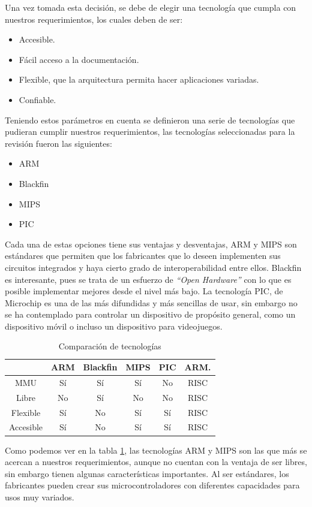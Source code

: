 Una vez tomada esta decisión, se debe de elegir una tecnología que
cumpla con nuestros requerimientos, los cuales deben de ser:
\begin{itemize}
\item Accesible.
\item Fácil acceso a la documentación.
\item Flexible, que la arquitectura permita hacer aplicaciones variadas.
\item Confiable.
\end{itemize}
Teniendo estos parámetros en cuenta se definieron una serie de tecnologías
que pudieran cumplir nuestros requerimientos, las tecnologías seleccionadas
para la revisión fueron las siguientes:
\begin{itemize}
\item \ac{ARM}
\item Blackfin
\item \ac{MIPS}
\item \ac{PIC}
\end{itemize}
Cada una de estas opciones tiene sus ventajas y desventajas, \ac{ARM}
y \ac{MIPS} son estándares que permiten que los fabricantes que lo
deseen implementen sus circuitos integrados y haya cierto grado de
interoperabilidad entre ellos. Blackfin es interesante, pues se trata
de un esfuerzo de \emph{{}``Open Hardware'' }con lo que es posible
implementar mejores desde el nivel más bajo. La tecnología \ac{PIC},
de Microchip es una de las más difundidas y más sencillas de usar,
sin embargo no se ha contemplado para controlar un dispositivo de
propósito general, como un dispositivo móvil o incluso un dispositivo
para videojuegos.%
\begin{table}
\begin{tabular}{|c|c|c|c|c|c|}
\cline{2-6} 
\multicolumn{1}{c|}{} & ARM & Blackfin & MIPS & PIC & ARM.\tabularnewline
\hline 
MMU & Sí & Sí & Sí & No & RISC\tabularnewline
\hline 
Libre & No & Sí & No & No & RISC\tabularnewline
\hline 
Flexible & Sí & No & Sí & Sí & RISC\tabularnewline
\hline 
Accesible & Sí & No & Sí & Sí & RISC\tabularnewline
\hline
\end{tabular}

\caption{\label{tab:comp-tec-table}Comparación de tecnologías}

\end{table}


Como podemos ver en la tabla \ref{tab:comp-tec-table}, las tecnologías
ARM y MIPS son las que más se acercan a nuestros requerimientos, aunque
no cuentan con la ventaja de ser libres, sin embargo tienen algunas
características importantes. Al ser estándares, los fabricantes pueden
crear sus microcontroladores con diferentes capacidades para usos
muy variados. 

